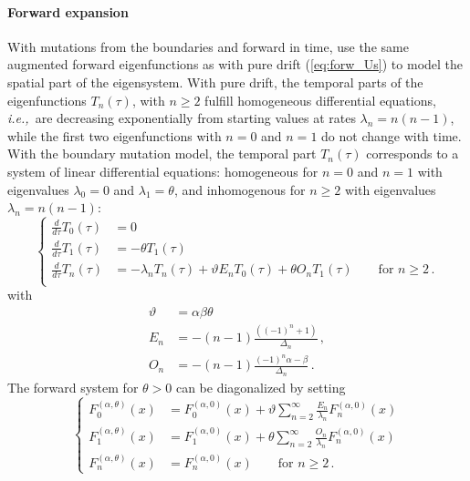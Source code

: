 \documentclass[preprint]{elsarticle}
\newcommand\ie{{\it i.e.,}}
\begin{document}
\paragraph{Forward expansion} 
With mutations from the boundaries and forward in time, \citet{Vogl16} use the same augmented forward eigenfunctions as with pure drift (\ref{eq:forw_Us}) to model the spatial part of the eigensystem. With pure drift, the temporal parts of the eigenfunctions $T_n(\tau)$, with $n\geq 2$ fulfill homogeneous differential equations, \ie\ are decreasing exponentially from starting values at rates $\lambda_n=n(n-1)$, while the first two eigenfunctions with $n=0$ and $n=1$ do not change with time. With the boundary mutation model, the temporal part $T_n(\tau)$ corresponds to a system of linear differential equations: homogeneous for $n=0$ and $n=1$ with eigenvalues $\lambda_0=0$ and $\lambda_1=\theta$, and inhomogenous for $n\geq 2$ with eigenvalues $\lambda_n=n(n-1)$:
\begin{equation}\label{eq:forward_inhomogenous}
\begin{cases}
  \frac{d}{d\tau} T_0(\tau)&= 0\\
  \frac{d}{d\tau} T_1(\tau)&= -\theta T_1(\tau)\\
  \frac{d}{d\tau} T_{n}(\tau)&= -\lambda_n T_n(\tau)+\vartheta E_n T_0(\tau)+\theta O_n T_1(\tau)\qquad\text{for $n\geq 2$}\,.\\
\end{cases}
\end{equation}
with 
\begin{equation}
\begin{split}
    \vartheta&=\alpha\beta\theta\,\\
    E_n&=-(n-1)\frac{((-1)^n+1)}{\Delta_n}\,,\\
    O_n&=-(n-1)\frac{(-1)^n\alpha-\beta}{\Delta_n}\,.
\end{split}
\end{equation}
The forward system for $\theta>0$ can be diagonalized by setting 
\begin{equation}\label{eq:forw_bound_diag}
\begin{cases}
    F_0^{(\alpha,\theta)}(x)&=F_0^{(\alpha,0)}(x)+\vartheta \sum_{n=2}^\infty \frac{E_n}{\lambda_n}F_n^{(\alpha,0)}(x)\\
    F_1^{(\alpha,\theta)}(x)&=F_1^{(\alpha,0)}(x)+\theta \sum_{n=2}^\infty \frac{O_n}{\lambda_n} F_n^{(\alpha,0)}(x)\\
    F_{n}^{(\alpha,\theta)}(x)&=F_n^{(\alpha,0)}(x)\qquad\text{for $n\geq 2$}\,.
\end{cases}
\end{equation}
\end{document}
